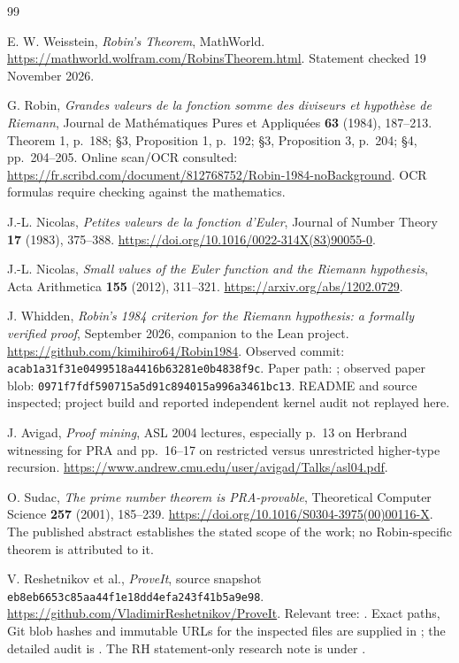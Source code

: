 \begin{thebibliography}{99}
\raggedright

E. W. Weisstein, \emph{Robin's Theorem}, MathWorld.
\url{https://mathworld.wolfram.com/RobinsTheorem.html}.
Statement checked 19 November 2026.

G. Robin, \emph{Grandes valeurs de la fonction somme des diviseurs et
hypoth\`ese de Riemann}, Journal de Math\'ematiques Pures et
Appliqu\'ees \textbf{63} (1984), 187--213.
Theorem 1, p.~188; \S3, Proposition 1, p.~192;
\S3, Proposition 3, p.~204; \S4, pp.~204--205.
Online scan/OCR consulted:
\url{https://fr.scribd.com/document/812768752/Robin-1984-noBackground}.
OCR formulas require checking against the mathematics.

J.-L. Nicolas, \emph{Petites valeurs de la fonction d'Euler},
Journal of Number Theory \textbf{17} (1983), 375--388.
\url{https://doi.org/10.1016/0022-314X(83)90055-0}.

J.-L. Nicolas, \emph{Small values of the Euler function and the
Riemann hypothesis}, Acta Arithmetica \textbf{155} (2012), 311--321.
\url{https://arxiv.org/abs/1202.0729}.

J. Whidden, \emph{Robin's 1984 criterion for the Riemann hypothesis:
a formally verified proof}, September 2026, companion to the
 Lean project.
\url{https://github.com/kimihiro64/Robin1984}.
Observed commit:
\texttt{acab1a31f31e0499518a4416b63281e0b4838f9c}.
Paper path: ;
observed paper blob:
\texttt{0971f7fdf590715a5d91c894015a996a3461bc13}.
README and source inspected; project build and reported independent
kernel audit not replayed here.

J. Avigad, \emph{Proof mining}, ASL 2004 lectures, especially
p.~13 on Herbrand witnessing for PRA and pp.~16--17 on
restricted versus unrestricted higher-type recursion.
\url{https://www.andrew.cmu.edu/user/avigad/Talks/asl04.pdf}.

O. Sudac, \emph{The prime number theorem is PRA-provable},
Theoretical Computer Science \textbf{257} (2001), 185--239.
\url{https://doi.org/10.1016/S0304-3975(00)00116-X}.
The published abstract establishes the stated scope of the work;
no Robin-specific theorem is attributed to it.

V. Reshetnikov et al., \emph{ProveIt}, source snapshot
\texttt{eb8eb6653c85aa44f1e18dd4efa243f41b5a9e98}.
\url{https://github.com/VladimirReshetnikov/ProveIt}.
Relevant tree: .
Exact paths, Git blob hashes and immutable URLs for the inspected
files are supplied in ;
the detailed audit is .
The RH statement-only research note is under
.

\end{thebibliography}
